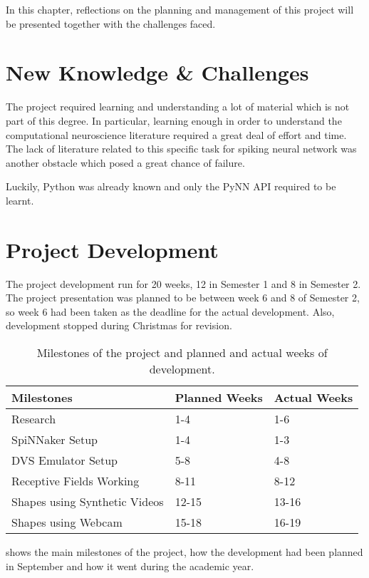 In this chapter, reflections on the planning and management of this project will be presented together with the challenges faced. 

\section{New Knowledge \& Challenges}
The project required learning and understanding a lot of material which is not part of this degree. In particular, learning enough in order to understand the computational neuroscience literature required a great deal of effort and time. The lack of literature related to this specific task for spiking neural network was another obstacle which posed a great chance of failure. 

Luckily, Python was already known and only the PyNN API required to be learnt. 

\section{Project Development}
The project development run for 20 weeks, 12 in Semester 1 and 8 in Semester 2. The project presentation was planned to be between week 6 and 8 of Semester 2, so week 6 had been taken as the deadline for the actual development. Also, development stopped during Christmas for revision.

\begin{table}[ht]
\centering
\begin{tabular}{l|ll}
Milestones                    & Planned Weeks & Actual Weeks \\ \hline
Research                      & 1-4           & 1-6          \\
SpiNNaker Setup               & 1-4           & 1-3          \\
DVS Emulator Setup            & 5-8           & 4-8          \\
Receptive Fields Working      & 8-11          & 8-12         \\
Shapes using Synthetic Videos & 12-15         & 13-16        \\
Shapes using Webcam           & 15-18         & 16-19       
\end{tabular}
\caption{Milestones of the project and planned and actual weeks of development.}
\label{table:development}
\end{table}

 shows the main milestones of the project, how the development had been planned in September and how it went during the academic year.

